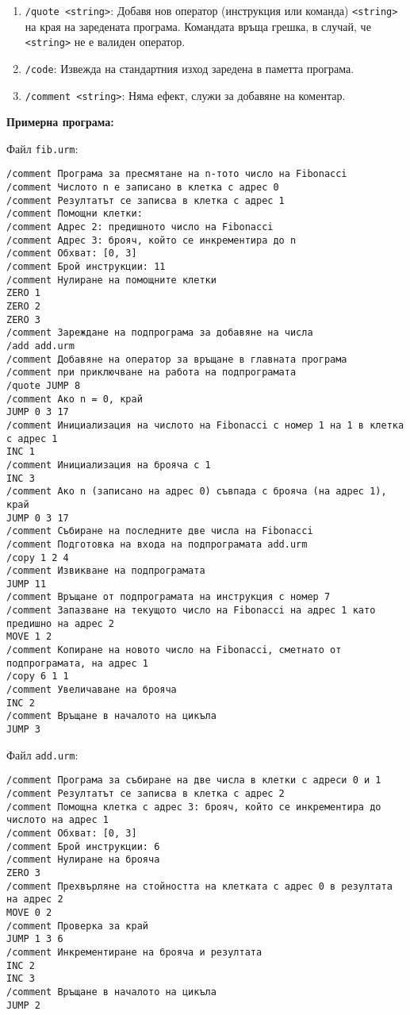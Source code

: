 \documentclass[12pt,a4paper]{article}
\newcommand{\code}[1]{\texttt{#1}}
\begin{document}
{\begin{enumerate}
    Операторите на $P$ да се добавят последователно към края на заредената в паметта програма.
    \item \code{/quote <string>}: Добавя нов оператор (инструкция или команда) \code{<string>} на края на заредената програма. Командата връща грешка, в случай, че \code{<string>} не е валиден оператор.
    \item \code{/code}: Извежда на стандартния изход заредена в паметта програма.
    \item \code{/comment <string>}: Няма ефект, служи за добавяне на коментар.
    \end{enumerate}

    \textbf{Примерна програма:}

Файл \code{fib.urm}:
\begin{verbatim}
/comment Програма за пресмятане на n-тото число на Fibonacci
/comment Числото n е записано в клетка с адрес 0
/comment Резултатът се записва в клетка с адрес 1
/comment Помощни клетки:
/comment Адрес 2: предишното число на Fibonacci
/comment Адрес 3: брояч, който се инкрементира до n
/comment Обхват: [0, 3]
/comment Брой инструкции: 11
/comment Нулиране на помощните клетки
ZERO 1
ZERO 2
ZERO 3
/comment Зареждане на подпрограма за добавяне на числа
/add add.urm
/comment Добавяне на оператор за връщане в главната програма
/comment при приключване на работа на подпрограмата
/quote JUMP 8
/comment Ако n = 0, край
JUMP 0 3 17
/comment Инициализация на числото на Fibonacci с номер 1 на 1 в клетка с адрес 1
INC 1
/comment Инициализация на брояча с 1
INC 3
/comment Ако n (записано на адрес 0) съвпада с брояча (на адрес 1), край
JUMP 0 3 17
/comment Събиране на последните две числа на Fibonacci
/comment Подготовка на входа на подпрограмата add.urm
/copy 1 2 4
/comment Извикване на подпрограмата
JUMP 11
/comment Връщане от подпрограмата на инструкция с номер 7
/comment Запазване на текущото число на Fibonacci на адрес 1 като предишно на адрес 2
MOVE 1 2
/comment Копиране на новото число на Fibonacci, сметнато от подпрограмата, на адрес 1
/copy 6 1 1
/comment Увеличаване на брояча
INC 2
/comment Връщане в началото на цикъла
JUMP 3
\end{verbatim}

Файл \code{add.urm}:
\begin{verbatim}
/comment Програма за събиране на две числа в клетки с адреси 0 и 1
/comment Резултатът се записва в клетка с адрес 2
/comment Помощна клетка с адрес 3: брояч, който се инкрементира до числото на адрес 1
/comment Обхват: [0, 3]
/comment Брой инструкции: 6
/comment Нулиране на брояча
ZERO 3
/comment Прехвърляне на стойността на клетката с адрес 0 в резултата на адрес 2
MOVE 0 2
/comment Проверка за край
JUMP 1 3 6
/comment Инкрементиране на брояча и резултата
INC 2
INC 3
/comment Връщане в началото на цикъла
JUMP 2
\end{verbatim}

}
\end{document}
